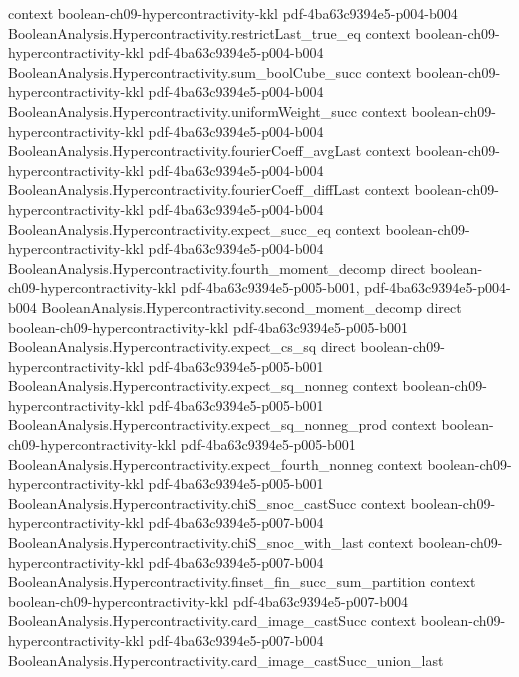 \begin{theorem}
  {context}
  {boolean-ch09-hypercontractivity-kkl}
  {pdf-4ba63c9394e5-p004-b004}
\proofstep
  {BooleanAnalysis.Hypercontractivity.restrictLast_true_eq}
  {context}
  {boolean-ch09-hypercontractivity-kkl}
  {pdf-4ba63c9394e5-p004-b004}
\proofstep
  {BooleanAnalysis.Hypercontractivity.sum_boolCube_succ}
  {context}
  {boolean-ch09-hypercontractivity-kkl}
  {pdf-4ba63c9394e5-p004-b004}
\proofstep
  {BooleanAnalysis.Hypercontractivity.uniformWeight_succ}
  {context}
  {boolean-ch09-hypercontractivity-kkl}
  {pdf-4ba63c9394e5-p004-b004}
\proofstep
  {BooleanAnalysis.Hypercontractivity.fourierCoeff_avgLast}
  {context}
  {boolean-ch09-hypercontractivity-kkl}
  {pdf-4ba63c9394e5-p004-b004}
\proofstep
  {BooleanAnalysis.Hypercontractivity.fourierCoeff_diffLast}
  {context}
  {boolean-ch09-hypercontractivity-kkl}
  {pdf-4ba63c9394e5-p004-b004}
\proofstep
  {BooleanAnalysis.Hypercontractivity.expect_succ_eq}
  {context}
  {boolean-ch09-hypercontractivity-kkl}
  {pdf-4ba63c9394e5-p004-b004}
\proofstep
  {BooleanAnalysis.Hypercontractivity.fourth_moment_decomp}
  {direct}
  {boolean-ch09-hypercontractivity-kkl}
  {pdf-4ba63c9394e5-p005-b001,
    pdf-4ba63c9394e5-p004-b004}
\proofstep
  {BooleanAnalysis.Hypercontractivity.second_moment_decomp}
  {direct}
  {boolean-ch09-hypercontractivity-kkl}
  {pdf-4ba63c9394e5-p005-b001}
\proofstep
  {BooleanAnalysis.Hypercontractivity.expect_cs_sq}
  {direct}
  {boolean-ch09-hypercontractivity-kkl}
  {pdf-4ba63c9394e5-p005-b001}
\proofstep
  {BooleanAnalysis.Hypercontractivity.expect_sq_nonneg}
  {context}
  {boolean-ch09-hypercontractivity-kkl}
  {pdf-4ba63c9394e5-p005-b001}
\proofstep
  {BooleanAnalysis.Hypercontractivity.expect_sq_nonneg_prod}
  {context}
  {boolean-ch09-hypercontractivity-kkl}
  {pdf-4ba63c9394e5-p005-b001}
\proofstep
  {BooleanAnalysis.Hypercontractivity.expect_fourth_nonneg}
  {context}
  {boolean-ch09-hypercontractivity-kkl}
  {pdf-4ba63c9394e5-p005-b001}
\proofstep
  {BooleanAnalysis.Hypercontractivity.chiS_snoc_castSucc}
  {context}
  {boolean-ch09-hypercontractivity-kkl}
  {pdf-4ba63c9394e5-p007-b004}
\proofstep
  {BooleanAnalysis.Hypercontractivity.chiS_snoc_with_last}
  {context}
  {boolean-ch09-hypercontractivity-kkl}
  {pdf-4ba63c9394e5-p007-b004}
\proofstep
  {BooleanAnalysis.Hypercontractivity.finset_fin_succ_sum_partition}
  {context}
  {boolean-ch09-hypercontractivity-kkl}
  {pdf-4ba63c9394e5-p007-b004}
\proofstep
  {BooleanAnalysis.Hypercontractivity.card_image_castSucc}
  {context}
  {boolean-ch09-hypercontractivity-kkl}
  {pdf-4ba63c9394e5-p007-b004}
\proofstep
  {BooleanAnalysis.Hypercontractivity.card_image_castSucc_union_last}

\end{theorem}
